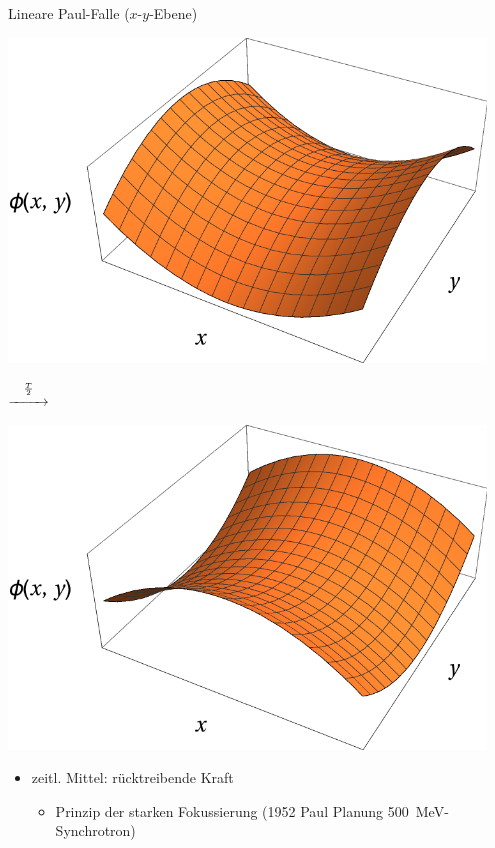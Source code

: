 \documentclass[12pt,xcolor=dvipsnames]{beamer}
\begin{document}
\begin{frame}{Lineare Paul-Falle ($x$-$y$-Ebene)}
	\begin{minipage}[t]{0.45\textwidth}
		\centering
		\includegraphics[width=0.95\textwidth]{./figures/sattelpotential.pdf}
	\end{minipage}%
	\begin{minipage}[c]{0.1\textwidth}
		$\stackrel{\frac{T}{2}}{\xrightarrow{\hspace*{.8cm}}}$
	\end{minipage}%
	\begin{minipage}[t]{0.45\textwidth}
		\centering
		\includegraphics[width=0.95\textwidth]{./figures/sattelpotential2.pdf}
	\end{minipage}
	\vspace{0.3cm}
	\begin{itemize}
		\item \alert{zeitl. Mittel:} rücktreibende Kraft
		\begin{itemize}
			\item Prinzip der starken Fokussierung (1952 Paul Planung \SI{500}{MeV}-Synchrotron)
		\end{itemize}
	\end{itemize}
\end{frame}
\end{document}
